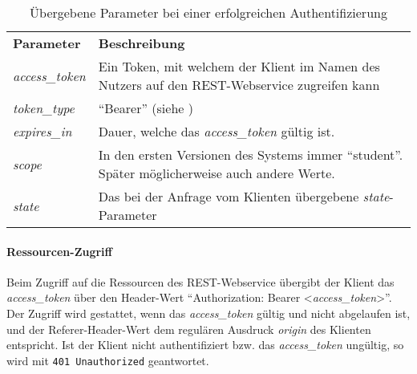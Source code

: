 \begin{table}
	\begin{tabular}{@{} | p{.2\linewidth} | p{.75\linewidth} | @{}}
		\hline
		\textbf{Parameter} & \textbf{Beschreibung}\\ \hhline{|=|=|}
		\textit{access\_token} & Ein Token, mit welchem der Klient im Namen des Nutzers auf den REST-Webservice zugreifen kann\\ \hline
		\textit{token\_type} & \enquote{Bearer} (siehe \cite[Kap. 7.1]{rfc6749}) \\ \hline
		\textit{expires\_in} & Dauer, welche das \textit{access\_token} gültig ist. \\ \hline
		\textit{scope} & In den ersten Versionen des Systems immer \enquote{student}. Später möglicherweise auch andere Werte.\\ \hline
		\textit{state} & Das bei der Anfrage vom Klienten übergebene \textit{state}-Parameter\\
		\hline
	\end{tabular}
	\caption{Übergebene Parameter bei einer erfolgreichen Authentifizierung}
	\label{tab:api-auth-login-res-success}
\end{table}

\paragraph{Ressourcen-Zugriff}
Beim Zugriff auf die Ressourcen des REST-Webservice übergibt der Klient das \textit{access\_token} über den Header-Wert \enquote{Authorization: Bearer <\textit{access\_token}>}.
Der Zugriff wird gestattet, wenn das \textit{access\_token} gültig und nicht abgelaufen ist, und der Referer-Header-Wert dem regulären Ausdruck \textit{origin} des Klienten entspricht.
Ist der Klient nicht authentifiziert bzw. das \textit{access\_token} ungültig, so wird mit \texttt{401 Unauthorized} geantwortet.
